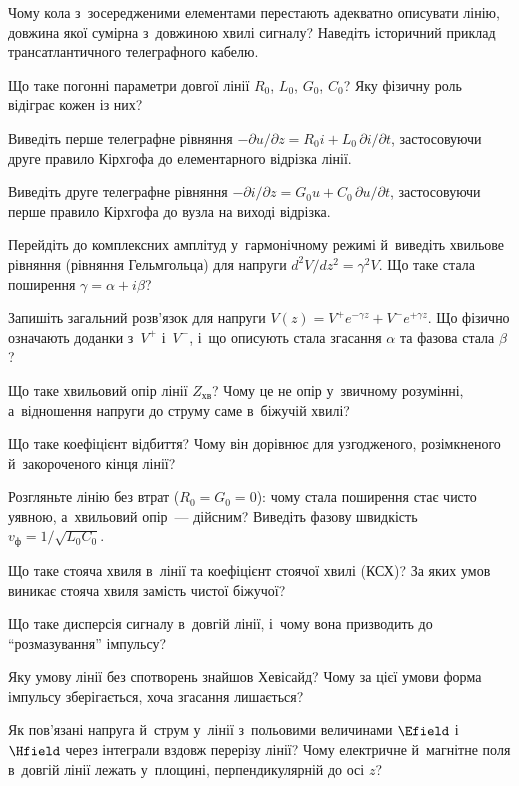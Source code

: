 \begin{Questions}
	\begin{quizlist}
		\item Чому кола з~зосередженими елементами перестають адекватно описувати лінію, довжина якої сумірна з~довжиною хвилі сигналу? Наведіть історичний приклад трансатлантичного телеграфного кабелю.
		\item Що таке погонні параметри довгої лінії $R_0$, $L_0$, $G_0$, $C_0$? Яку фізичну роль відіграє кожен із них?
		\item Виведіть перше телеграфне рівняння $-\partial u/\partial z = R_0 i + L_0\,\partial i/\partial t$, застосовуючи друге правило Кірхгофа до елементарного відрізка лінії.
		\item Виведіть друге телеграфне рівняння $-\partial i/\partial z = G_0 u + C_0\,\partial u/\partial t$, застосовуючи перше правило Кірхгофа до вузла на виході відрізка.
		\item Перейдіть до комплексних амплітуд у~гармонічному режимі й~виведіть хвильове рівняння (рівняння Гельмгольца) для напруги $d^2V/dz^2=\gamma^2V$. Що таке стала поширення $\gamma=\alpha+i\beta$?
		\item Запишіть загальний розв'язок для напруги $V(z)=V^+e^{-\gamma z}+V^-e^{+\gamma z}$. Що фізично означають доданки з~$V^+$ і~$V^-$, і~що описують стала згасання $\alpha$ та фазова стала $\beta$?
		\item Що таке хвильовий опір лінії $Z_\text{хв}$? Чому це не опір у~звичному розумінні, а~відношення напруги до струму саме в~біжучій хвилі?
		\item Що таке коефіцієнт відбиття? Чому він дорівнює для узгодженого, розімкненого й~закороченого кінця лінії?
		\item Розгляньте лінію без втрат ($R_0=G_0=0$): чому стала поширення стає чисто уявною, а~хвильовий опір~--- дійсним? Виведіть фазову швидкість $v_\text{ф}=1/\sqrt{L_0C_0}$.
		\item Що таке стояча хвиля в~лінії та коефіцієнт стоячої хвилі (КСХ)? За яких умов виникає стояча хвиля замість чистої біжучої?
		\item Що таке дисперсія сигналу в~довгій лінії, і~чому вона призводить до \enquote{розмазування} імпульсу?
		\item Яку умову лінії без спотворень знайшов Хевісайд? Чому за цієї умови форма імпульсу зберігається, хоча згасання лишається?
		\item Як пов'язані напруга й~струм у~лінії з~польовими величинами $\Efield$ і~$\Hfield$ через інтеграли вздовж перерізу лінії? Чому електричне й~магнітне поля в~довгій лінії лежать у~площині, перпендикулярній до осі $z$?

\end{quizlist}
\end{Questions}
